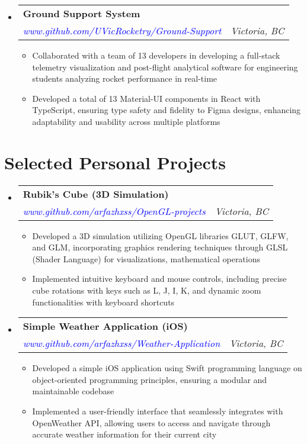 \documentclass[a4paper,10pt]{article}
\makeatletter
\newcommand{\resumeItemDot}[1]
{\item \normalsize{#1}}
\newcommand{\resumeSubheading}[4]{
  \item
    \begin{tabular*}{\dimexpr\textwidth-1.2em\relax}{@{}l@{\extracolsep{\fill}}r@{}}
      \large \textbf{#1} & \fontsize{11}{12}\selectfont \text{#2} \\
      \textit{#3} & \textit{#4} \\
    \end{tabular*}\vspace{-2pt}
}
\newenvironment{resumeSubHeadingListStart}
{\begin{itemize}[leftmargin=0.10in, label={}]}
{\end{itemize}}
\newenvironment{resumeItemListStart}
{\begin{itemize}[leftmargin=0.15in, label={$\bullet$}]}
{\end{itemize}}
\makeatother
\begin{document}
\begin{resumeSubHeadingListStart}
\resumeSubheading
    {Ground Support System}
    {Jul 2023 – Jan 2024}
    {\textcolor{blue}{www.github.com/UVicRocketry/Ground-Support}}
    {Victoria, BC}
\begin{resumeItemListStart}
    \resumeItemDot{Collaborated with a team of 13 developers in developing a full-stack telemetry visualization and post-flight analytical software for engineering students analyzing rocket performance in real-time}
    \resumeItemDot{Developed a total of 13 Material-UI components in React with TypeScript, ensuring type safety and fidelity to Figma designs, enhancing adaptability and usability across multiple platforms}
\end{resumeItemListStart}
\end{resumeSubHeadingListStart}

\section{Selected Personal Projects}
\begin{resumeSubHeadingListStart}
\resumeSubheading
    {Rubik’s Cube (3D Simulation)}{Feb 2023 – June 2023}
    {\textcolor{blue}{www.github.com/arfazhxss/OpenGL-projects}}
    {Victoria, BC}
\begin{resumeItemListStart}
    \resumeItemDot{Developed a 3D simulation utilizing OpenGL libraries GLUT, GLFW, and GLM, incorporating graphics rendering techniques through GLSL (Shader Language) for visualizations, mathematical operations}
    \resumeItemDot{Implemented intuitive keyboard and mouse controls, including precise cube rotations with keys such as L, J, I, K, and dynamic zoom functionalities with keyboard shortcuts}
\end{resumeItemListStart}
\end{resumeSubHeadingListStart}

\begin{resumeSubHeadingListStart}
\resumeSubheading
    {Simple Weather Application (iOS)}
    {Apr 2023 – Nov 2023}
    {\textcolor{blue}{www.github.com/arfazhxss/Weather-Application}}
    {Victoria, BC}
\begin{resumeItemListStart}
    \resumeItemDot{Developed a simple iOS application using Swift programming language on object-oriented programming principles, ensuring a modular and maintainable codebase}
    \resumeItemDot{Implemented a user-friendly interface that seamlessly integrates with OpenWeather API, allowing users to access and navigate through accurate weather information for their current city}
\end{resumeItemListStart}
\end{resumeSubHeadingListStart}
\end{document}
